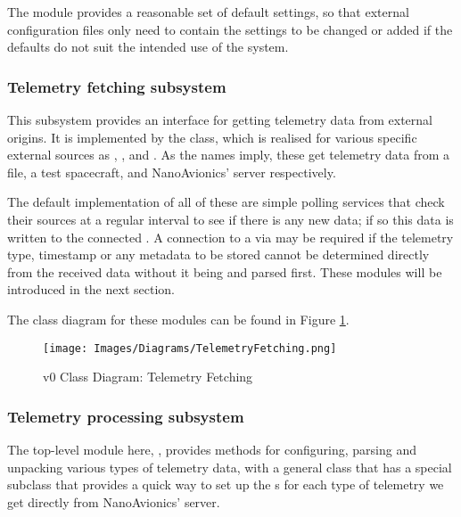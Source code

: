 The  module provides a reasonable set of default settings, so that external configuration files only need to contain the settings to be changed or added if the defaults do not suit the intended use of the system.

\subsubsection{Telemetry fetching subsystem}
This subsystem provides an interface for getting telemetry data from external origins. It is implemented by the  class, which is realised for various specific external sources as , , and . As the names imply, these get telemetry data from a file, a test spacecraft, and NanoAvionics’ server respectively.

The default implementation of all of these are simple polling services that check their sources at a regular interval to see if there is any new data; if so this data is written to the connected . A connection to a  via  may be required if the telemetry type, timestamp or any metadata to be stored cannot be determined directly from the received data without it being  and parsed first. These modules will be introduced in the next section.

The class diagram for these modules can be found in Figure \ref{fig:cdfetching}.

\begin{figure}[H]
  \centering
  \texttt{[image: Images/Diagrams/TelemetryFetching.png]}
  \caption{v0 Class Diagram: Telemetry Fetching}
  \label{fig:cdfetching}
\end{figure}

\subsubsection{Telemetry processing subsystem}
The top-level module here, , provides methods for configuring, parsing and \gls{unpacking} various types of telemetry data, with a general class  that has a special subclass  that provides a quick way to set up the s for each type of telemetry we get directly from NanoAvionics’ server.

